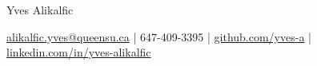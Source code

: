 

\centerline{\Huge{Yves Alikalfic}}

\vspace{5pt}


\centerline{\href{mailto:alikalfic.yves@queensu.ca}{alikalfic.yves@queensu.ca} | 647-409-3395 | \href{https://github.com/yves-a}{github.com/yves-a} |  \href{https://linkedin.com/in/yves-alikalfic}{linkedin.com/in/yves-alikalfic}}


